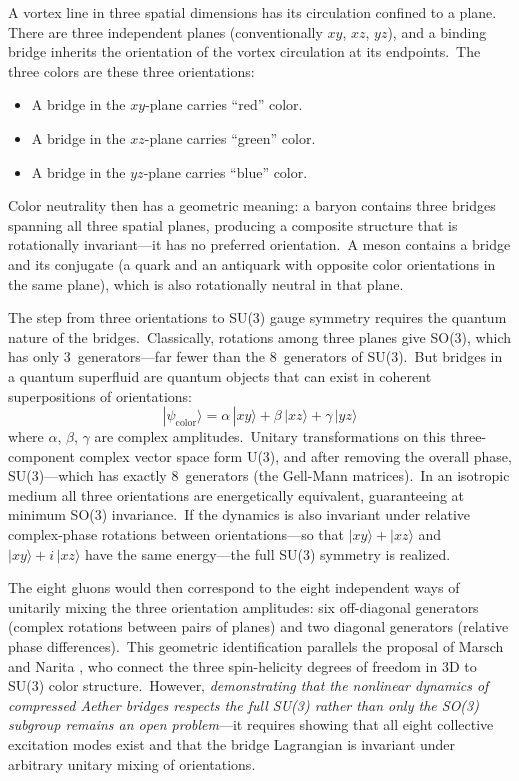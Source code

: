 ﻿\documentclass[12pt,letterpaper]{article}
\begin{document}
A vortex line in three spatial dimensions has its circulation confined to a plane.
There are three independent planes (conventionally $xy$, $xz$, $yz$), and a binding
bridge inherits the orientation of the vortex circulation at its endpoints.\ The three
colors are these three orientations:
%
\begin{itemize}[leftmargin=2em]
  \item A bridge in the $xy$-plane carries ``red'' color.
  \item A bridge in the $xz$-plane carries ``green'' color.
  \item A bridge in the $yz$-plane carries ``blue'' color.
\end{itemize}
%
Color neutrality then has a geometric meaning: a baryon contains three bridges spanning
all three spatial planes, producing a composite structure that is rotationally
invariant---it has no preferred orientation.\ A meson contains a bridge and its
conjugate (a quark and an antiquark with opposite color orientations in the same plane),
which is also rotationally neutral in that plane.

The step from three orientations to SU(3) gauge symmetry requires the quantum
nature of the bridges.\ Classically, rotations among three planes give SO(3),
which has only 3~generators---far fewer than the 8~generators of SU(3).\ But
bridges in a quantum superfluid are quantum objects that can exist in coherent
superpositions of orientations:
%
\begin{equation}
  |\psi_{\mathrm{color}}\rangle = \alpha\,|xy\rangle + \beta\,|xz\rangle + \gamma\,|yz\rangle
\end{equation}
%
where $\alpha$, $\beta$, $\gamma$ are complex amplitudes.\ Unitary
transformations on this three-component complex vector space form U(3),
and after removing the overall phase, SU(3)---which has exactly
8~generators (the Gell-Mann matrices).\ In an isotropic medium all three
orientations are energetically equivalent, guaranteeing at minimum SO(3)
invariance.\ If the dynamics is also invariant under relative complex-phase
rotations between orientations---so that $|xy\rangle + |xz\rangle$ and
$|xy\rangle + i\,|xz\rangle$ have the same energy---the full SU(3)
symmetry is realized.

The eight gluons would then correspond to the eight independent ways of
unitarily mixing the three orientation amplitudes: six off-diagonal
generators (complex rotations between pairs of planes) and two diagonal
generators (relative phase differences).\ This geometric identification
parallels the proposal of Marsch and Narita \cite{marsch2021}, who
connect the three spin-helicity degrees of freedom in 3D to SU(3) color
structure.\ However, \emph{demonstrating that the nonlinear dynamics of
compressed Aether bridges respects the full SU(3) rather than only the
SO(3) subgroup remains an open problem}---it requires showing that all
eight collective excitation modes exist and that the bridge Lagrangian
is invariant under arbitrary unitary mixing of orientations.
\end{document}
